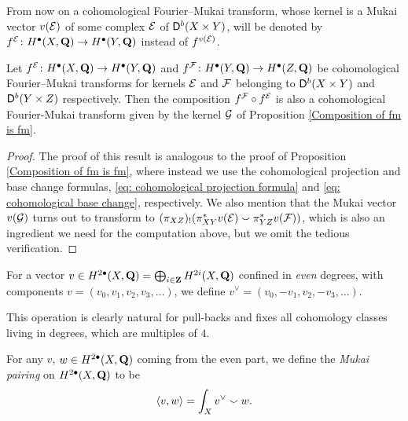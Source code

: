 From now on a cohomological Fourier--Mukai transform, whose kernel is a Mukai vector $v(\mathcal E)$ of some complex $\mathcal E$ of $\mathsf{D}^b(X \times Y)$, will be denoted by $f^{\mathcal E} \colon H^{\bullet}(X, \mathbf Q) \to H^{\bullet}(Y, \mathbf Q)$ instead of $f^{v(\mathcal E)}$.   

\begin{proposition}
    \label{Composition of cohomological fm is fm}
    Let $f^{\mathcal E} \colon H^\bullet(X, \mathbf Q) \to H^\bullet(Y, \mathbf Q)$ and $f^{\mathcal F} \colon H^\bullet(Y, \mathbf Q) \to H^\bullet(Z, \mathbf Q)$ be cohomological Fourier--Mukai transforms for kernels $\mathcal E$ and $\mathcal F$ belonging to $\mathsf{D}^b(X \times Y)$ and $\mathsf{D}^b(Y \times Z)$ respectively. Then the composition $f^{\mathcal F} \circ f^{\mathcal E}$ is also a cohomological Fourier-Mukai transform given by the kernel $\mathcal G$ of Proposition \ref{Composition of fm is fm}.
\end{proposition}

\begin{proof}
    The proof of this result is analogous to the proof of Proposition \ref{Composition of fm is fm}, where instead we use the cohomological projection and base change formulas, \eqref{eq: cohomological projection formula} and \eqref{eq: cohomological base change}, respectively. We also mention that the Mukai vector $v(\mathcal G)$ turns out to transform to $(\pi_{XZ})_!(\pi_{XY}^*v(\mathcal E) \smallsmile \pi_{YZ}^*v(\mathcal F))$, which is also an ingredient we need for the computation above, but we omit the tedious verification.
\end{proof}

\begin{definition}
    \label{Definition of v vee}
    For a vector $v \in H^{2\bullet}(X, \mathbf Q) = \bigoplus_{i \in \mathbf Z} H^{2i}(X, \mathbf Q)$ confined in \emph{even} degrees, with components $v = (v_0, v_1, v_2, v_3, \dots)$, we define $v^\vee = (v_0, -v_1, v_2, -v_3, \dots)$.
\end{definition}

This operation is clearly natural for pull-backs and fixes all cohomology classes living in degrees, which are multiples of $4$.  

\begin{definition}
    \label{Definition of Mukai pairing}
    For any $v$, $w \in H^{2\bullet}(X, \mathbf Q)$ coming from the even part, we define the \emph{Mukai pairing} on $H^{2\bullet}(X, \mathbf Q)$ to be
    \[
        \langle v, w \rangle = \int_X v^\vee \smallsmile w.
    \]
\end{definition}

